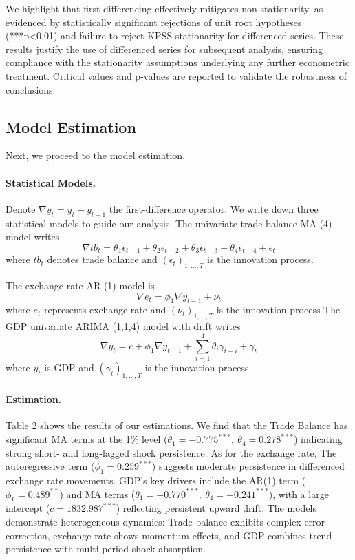\documentclass[
]{article}
\begin{document}
	We highlight that first-differencing effectively mitigates
	non-stationarity, as evidenced by statistically significant rejections of
	unit root hypotheses (***p<0.01) and failure to reject KPSS stationarity for 
	differenced series. These results justify the use of differenced series for subsequent analysis, 
	ensuring compliance with the stationarity assumptions underlying any further 
	econometric treatment. Critical values and p-values are reported to validate the robustness
	of conclusions.
	
	\subsection{Model Estimation}
	
	Next, we proceed to the model estimation.
	
	\paragraph*{Statistical Models.}
	
	Denote \( \nabla y_t = y_t - y_{t-1} \) the first-difference operator. We write
	down three statistical models to guide our analysis. The univariate trade balance MA (4) model writes
	\begin{equation}
		\nabla tb_t = \theta_1 \epsilon_{t-1} + \theta_2 \epsilon_{t-2} + \theta_3 \epsilon_{t-3} + \theta_4 \epsilon_{t-4} + \epsilon_t
	\end{equation}
	where \( tb_t \) denotes trade balance and $(\epsilon_t)_{1,..., T}$ is the innovation process.
	
	The exchange rate AR (1) model is 
	\begin{equation}
		\nabla e_t = \phi_1 \nabla y_{t-1} + \nu_t
	\end{equation}
	where \( e_t \) represents exchange rate and $(\nu_t)_{1,..., T}$ is the innovation process 
	The GDP univariate ARIMA (1,1,4) model with drift writes
	\begin{equation}
		\nabla y_t = c + \phi_1 \nabla y_{t-1} + \sum_{i=1}^4 \theta_i \gamma_{t-i} + \gamma_t
	\end{equation}
	where \( y_t \) is GDP and $(\gamma_t)_{1,..., T}$ is the innovation process.
	
	\paragraph*{Estimation.} Table 2 shows the results of our estimations. We find that the Trade Balance 
	has significant MA terms at the 1\% level (\( \theta_1 = -0.775^{***},\ \theta_4 = 0.278^{***} \)) 
	indicating strong short- and long-lagged shock persistence. As for the exchange rate,
	The autoregressive term (\( \phi_1 = 0.259^{***} \)) suggests moderate persistence 
	in differenced exchange rate movements. GDP's key drivers include the AR(1)
	term (\( \phi_1 = 0.489^{**} \)) and MA terms (\( \theta_1 = -0.770^{***},\ 
	\theta_4 = -0.241^{***} \)), with a large intercept (\( c = 1832.987^{***} \)) 
	reflecting persistent upward drift. The models
	demonstrate heterogeneous dynamics: Trade balance exhibits complex error correction, 
	exchange rate shows momentum effects, and GDP combines trend persistence with 
	multi-period shock absorption. 
	
\end{document}
